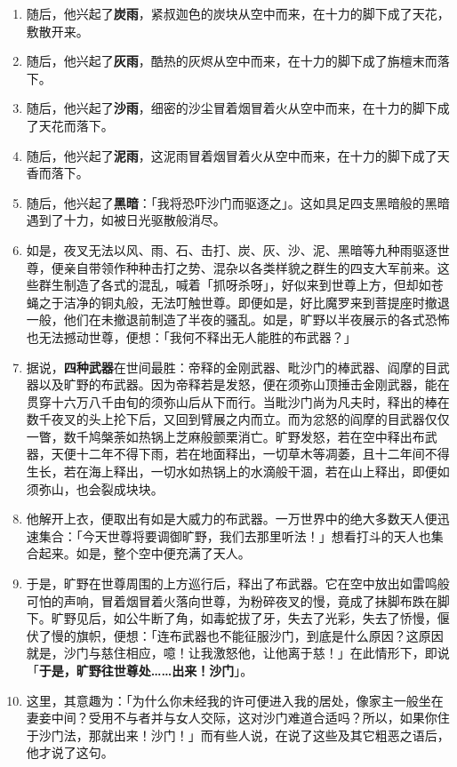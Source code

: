 \begin{enumerate}
\item 随后，他兴起了\textbf{炭雨}，紧叔迦色的炭块从空中而来，在十力的脚下成了天花，敷散开来。
\item 随后，他兴起了\textbf{灰雨}，酷热的灰烬从空中而来，在十力的脚下成了旃檀末而落下。
\item 随后，他兴起了\textbf{沙雨}，细密的沙尘冒着烟冒着火从空中而来，在十力的脚下成了天花而落下。
\item 随后，他兴起了\textbf{泥雨}，这泥雨冒着烟冒着火从空中而来，在十力的脚下成了天香而落下。
\item 随后，他兴起了\textbf{黑暗}：「我将恐吓沙门而驱逐之」。这如具足四支黑暗般的黑暗遇到了十力，如被日光驱散般消尽。
\item 如是，夜叉无法以风、雨、石、击打、炭、灰、沙、泥、黑暗等九种雨驱逐世尊，便亲自带领作种种击打之势、混杂以各类样貌之群生的四支大军前来。这些群生制造了各式的混乱，喊着「抓呀杀呀」，好似来到世尊上方，但却如苍蝇之于洁净的铜丸般，无法叮触世尊。即便如是，好比魔罗来到菩提座时撤退一般，他们在未撤退前制造了半夜的骚乱。如是，旷野以半夜展示的各式恐怖也无法撼动世尊，便想：「我何不释出无人能胜的布武器？」
\item 据说，\textbf{四种武器}在世间最胜：帝释的金刚武器、毗沙门的棒武器、阎摩的目武器以及旷野的布武器。因为帝释若是发怒，便在须弥山顶捶击金刚武器，能在贯穿十六万八千由旬的须弥山后从下而行。当毗沙门尚为凡夫时，释出的棒在数千夜叉的头上抡下后，又回到臂展之内而立。而为忿怒的阎摩的目武器仅仅一瞥，数千鸠槃荼如热锅上芝麻般颤栗消亡。旷野发怒，若在空中释出布武器，天便十二年不得下雨，若在地面释出，一切草木等凋萎，且十二年间不得生长，若在海上释出，一切水如热锅上的水滴般干涸，若在山上释出，即便如须弥山，也会裂成块块。
\item 他解开上衣，便取出有如是大威力的布武器。一万世界中的绝大多数天人便迅速集合：「今天世尊将要调御旷野，我们去那里听法！」想看打斗的天人也集合起来。如是，整个空中便充满了天人。
\item 于是，旷野在世尊周围的上方巡行后，释出了布武器。它在空中放出如雷鸣般可怕的声响，冒着烟冒着火落向世尊，为粉碎夜叉的慢，竟成了抹脚布跌在脚下。旷野见后，如公牛断了角，如毒蛇拔了牙，失去了光彩，失去了㤭慢，偃伏了慢的旗帜，便想：「连布武器也不能征服沙门，到底是什么原因？这原因就是，沙门与慈住相应，噫！让我激怒他，让他离于慈！」在此情形下，即说「\textbf{于是，旷野往世尊处……出来！沙门}」。
\item 这里，其意趣为：「为什么你未经我的许可便进入我的居处，像家主一般坐在妻妾中间？受用不与者并与女人交际，这对沙门难道合适吗？所以，如果你住于沙门法，那就出来！沙门！」而有些人说，在说了这些及其它粗恶之语后，他才说了这句。

\end{enumerate}
